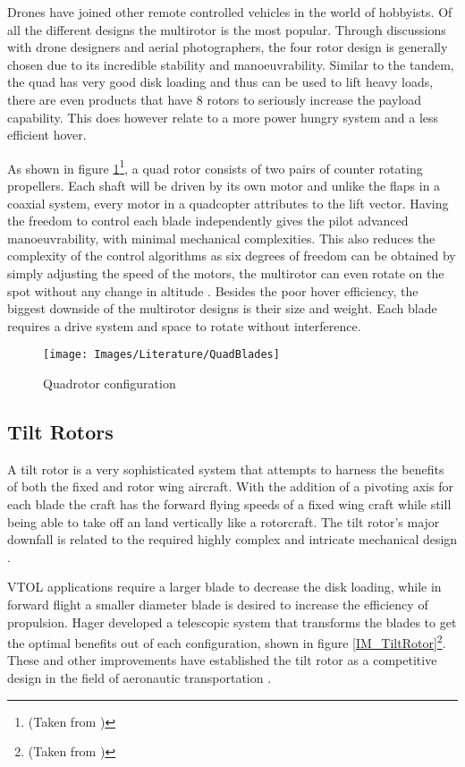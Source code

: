 	Drones have joined other remote controlled vehicles in the world of hobbyists. Of all the different designs the multirotor is the most popular. Through discussions with drone designers and aerial photographers, the four rotor design is generally chosen due to its incredible stability and manoeuvrability. Similar to the tandem, the quad has very good disk loading and thus can be used to lift heavy loads, there are even products that have 8 rotors to seriously increase the payload capability. This does however relate to a more power hungry system and a less efficient hover.
	
	As shown in figure \ref{IM_CounterBlades}\footnote{(Taken from \cite{ThrustCritical})}, a quad rotor consists of two pairs of counter rotating propellers. Each shaft will be driven by its own motor and unlike the flaps in a coaxial system, every motor in a quadcopter attributes to the lift vector. Having the freedom to control each blade independently gives the pilot advanced manoeuvrability, with minimal mechanical complexities. This also reduces the complexity of the control algorithms as six degrees of freedom can be obtained by simply adjusting the speed of the motors, the multirotor can even rotate on the spot without any change in altitude \cite{ThrustCritical}. Besides the poor hover efficiency, the biggest downside of the multirotor designs is their size and weight. Each blade requires a drive system and space to rotate without interference.
	
	\begin{figure}[H]
	\centering
	\texttt{[image: Images/Literature/QuadBlades]}
	\caption{Quadrotor configuration \cite{ThrustCritical}}
	\label{IM_CounterBlades}
	\end{figure}
	
	
	
	\subsection{Tilt Rotors}
	
	A tilt rotor is a very sophisticated system that attempts to harness the benefits of both the fixed and rotor wing aircraft. With the addition of a pivoting axis for each blade the craft has the forward flying speeds of a fixed wing craft while still being able to take off an land vertically like a rotorcraft. The tilt rotor's major downfall is related to the required highly complex and intricate mechanical design \cite{RotorConfig}.
	 
	VTOL applications require a larger blade to decrease the disk loading, while in forward flight a smaller diameter blade is desired to increase the efficiency of propulsion. Hager \cite{US6030177} developed a telescopic system that transforms the blades to get the optimal benefits out of each configuration, shown in figure \ref{IM_TiltRotor}\footnote{(Taken from \cite{Heli})}. These and other improvements have established the tilt rotor as a  competitive design in the field of aeronautic transportation \cite{RotorConfig}.
	
